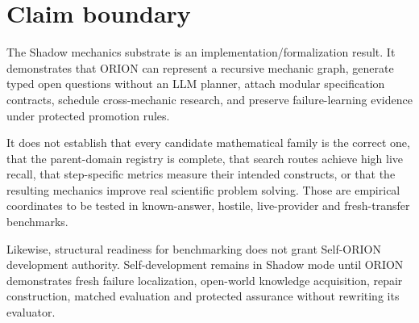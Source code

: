 \section{Claim boundary}
The Shadow mechanics substrate is an implementation/formalization result.  It demonstrates that ORION can represent a recursive mechanic graph, generate typed open questions without an LLM planner, attach modular specification contracts, schedule cross-mechanic research, and preserve failure-learning evidence under protected promotion rules.

It does not establish that every candidate mathematical family is the correct one, that the parent-domain registry is complete, that search routes achieve high live recall, that step-specific metrics measure their intended constructs, or that the resulting mechanics improve real scientific problem solving.  Those are empirical coordinates to be tested in known-answer, hostile, live-provider and fresh-transfer benchmarks.

Likewise, structural readiness for benchmarking does not grant Self-ORION development authority.  Self-development remains in Shadow mode until ORION demonstrates fresh failure localization, open-world knowledge acquisition, repair construction, matched evaluation and protected assurance without rewriting its evaluator.

